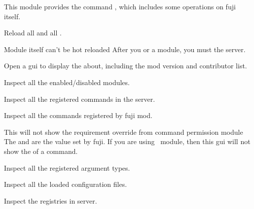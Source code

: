 \label{ch:fuji}

This module provides the command , which includes some operations on fuji itself.

Reload all  and all .

\begin{note}{Module itself can't be hot reloaded}
    After you  or  a module, you must  the server.
\end{note}

Open a gui to display the about, including the mod version and contributor list.

Inspect all the enabled/disabled modules.

Inspect all the registered commands in the server.

Inspect all the commands registered by fuji mod.

\begin{note}{This will not show the requirement override from command permission module}
    The  and  are the  value set by fuji.
    If you are using~ module, then this gui will not show the  of a command.
\end{note}

Inspect all the registered argument types.

Inspect all the loaded configuration files.

Inspect the registries in server.

